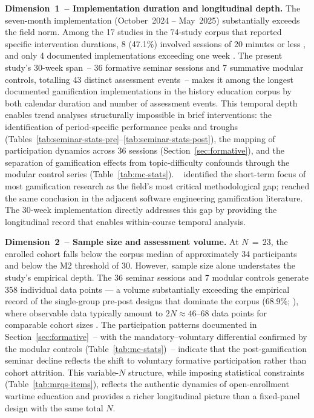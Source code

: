 \textbf{Dimension~1~-- Implementation duration and longitudinal depth.}
The seven-month implementation (October~2024 -- May~2025) substantially exceeds the
field norm. Among the 17 studies in the 74-study corpus that reported specific intervention
durations, 8 (47.1\%) involved sessions of 20 minutes or less
\cite{11Ternblad2023115, 21Ghulamani2017, 1Barbatsis201159}, and only 4 documented
implementations exceeding one week \cite{55Squire2004, 46Stirling2022, 9Lin2018,
48Moketar2021}. The present study's 30-week span~-- 36 formative seminar sessions and
7 summative modular controls, totalling 43 distinct assessment events~-- makes it
among the longest documented gamification implementations in the history education corpus by both
calendar duration and number of assessment events.
This temporal depth enables trend analyses structurally impossible in brief interventions:
the identification of period-specific performance peaks and troughs
(Tables~\ref{tab:seminar-stats-pre}--\ref{tab:seminar-stats-post}),
the mapping of participation dynamics across 36 sessions (Section~\ref{sec:formative}),
and the separation of gamification effects from topic-difficulty confounds through the
modular control series (Table~\ref{tab:mc-stats}).
\citeauthor{KoivistoHamari2019}~\cite{KoivistoHamari2019} identified the short-term focus of most gamification research
as the field's most critical methodological gap; \cite{Hernandez2017} reached the same
conclusion in the adjacent software engineering gamification literature.
The 30-week implementation directly addresses this gap by providing the longitudinal
record that enables within-course temporal analysis.

\textbf{Dimension~2~-- Sample size and assessment volume.}
At $N\,{=}\,23$, the enrolled cohort falls below the corpus median of approximately 34
participants \cite{Korniienko2025mrqs} and below the M2 threshold of 30.
However, sample size alone understates the study's empirical depth.
The 36 seminar sessions and 7 modular controls generate 358 individual data points ---
a volume substantially exceeding the empirical record of the single-group pre-post
designs that dominate the corpus (68.9\%; \cite{KorniienkoSemerikov2024}), where
observable data typically amount to $2N \approx 46$--68 data points for comparable
cohort sizes \cite{16Chen201447, 6Czerwinski2018, 8Yu2014}.
The participation patterns documented in Section~\ref{sec:formative}~-- with the mandatory--voluntary differential confirmed by the modular controls (Table~\ref{tab:mc-stats})~-- indicate that the post-gamification seminar decline reflects the shift to voluntary formative participation rather than cohort attrition.
This variable-$N$ structure, while imposing statistical constraints (Table~\ref{tab:mrqs-items}), reflects the authentic dynamics of open-enrollment wartime
education and provides a richer longitudinal picture than a fixed-panel design with the
same total $N$.

